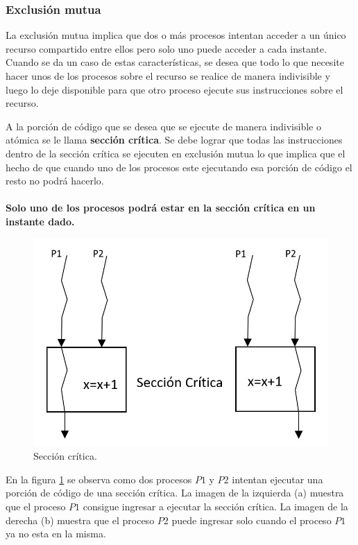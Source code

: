 \subsubsection{Exclusión mutua}
La exclusión mutua implica que dos o más procesos intentan acceder a un único recurso compartido entre ellos pero solo uno puede acceder a cada instante.
Cuando se da un caso de estas características, se desea que todo lo que necesite hacer unos de los procesos sobre el recurso se realice de manera indivisible y luego lo deje disponible para que otro proceso ejecute sus instrucciones sobre el recurso.
\par A la porción de código que se desea que se ejecute de manera indivisible o atómica se le llama \textbf{sección crítica}. Se debe lograr que todas las instrucciones dentro de la sección crítica se ejecuten en exclusión mutua lo que implica que el hecho de que cuando uno de los procesos este ejecutando esa porción de código el resto no podrá hacerlo. \\
\\
\textbf{Solo uno de los procesos podrá estar en la sección crítica en un instante dado.}

\begin{figure}[H]
	\centering
	\includegraphics[scale=0.5]{Figures/marco teorico/seccion.jpg}
	\caption{Sección crítica.}
	\label{fig:seccioncritica}
  \end{figure}
  
En la figura \ref{fig:seccioncritica} se observa como dos procesos $P1$ y $P2$ intentan ejecutar una porción de código de una sección crítica. La imagen de la izquierda (a) muestra que el proceso $P1$ consigue ingresar a ejecutar la sección crítica. La imagen de la derecha (b) muestra que el proceso $P2$ puede ingresar solo cuando el proceso $P1$ ya no esta en la misma.

